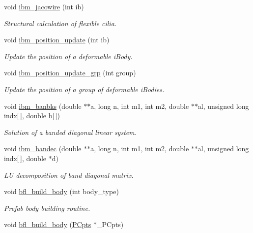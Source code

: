 \begin{DoxyCompactItemize}
void \hyperlink{class_object_manager_a956c12cba071c6b8844371c03433f82c}{ibm\+\_\+jacowire} (int ib)
\begin{DoxyCompactList}\small\item\em Structural calculation of flexible cilia. \end{DoxyCompactList}\item 
void \hyperlink{class_object_manager_a53eedab20e69a10ae861197b614751db}{ibm\+\_\+position\+\_\+update} (int ib)
\begin{DoxyCompactList}\small\item\em Update the position of a deformable i\+Body. \end{DoxyCompactList}\item 
void \hyperlink{class_object_manager_ae8f08e2935c8999db99b41a3c97b63c5}{ibm\+\_\+position\+\_\+update\+\_\+grp} (int group)
\begin{DoxyCompactList}\small\item\em Update the position of a group of deformable i\+Bodies. \end{DoxyCompactList}\item 
void \hyperlink{class_object_manager_a7bf970976700f9949bb08d8dc7f8e637}{ibm\+\_\+banbks} (double $\ast$$\ast$a, long n, int m1, int m2, double $\ast$$\ast$al, unsigned long indx\mbox{[}$\,$\mbox{]}, double b\mbox{[}$\,$\mbox{]})
\begin{DoxyCompactList}\small\item\em Solution of a banded diagonal linear system. \end{DoxyCompactList}\item 
void \hyperlink{class_object_manager_a77eb5ec758b5956e0a609fa1fba2f8e8}{ibm\+\_\+bandec} (double $\ast$$\ast$a, long n, int m1, int m2, double $\ast$$\ast$al, unsigned long indx\mbox{[}$\,$\mbox{]}, double $\ast$d)
\begin{DoxyCompactList}\small\item\em LU decomposition of band diagonal matrix. \end{DoxyCompactList}\item 
void \hyperlink{class_object_manager_a099a446ac7f045d11d6be6babd0a31ab}{bfl\+\_\+build\+\_\+body} (int body\+\_\+type)
\begin{DoxyCompactList}\small\item\em Prefab body building routine. \end{DoxyCompactList}\item 
void \hyperlink{class_object_manager_a56c65bd5122aa7e7026fb8d2315482f3}{bfl\+\_\+build\+\_\+body} (\hyperlink{class_p_cpts}{P\+Cpts} $\ast$\+\_\+\+P\+Cpts)

\end{DoxyCompactItemize}
